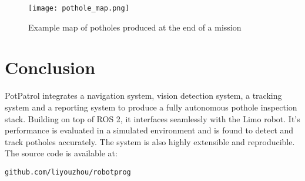 \documentclass[conference]{IEEEtran}
\begin{document}
\begin{figure}
    \centering
    \texttt{[image: pothole\_map.png]}
    \caption{Example map of potholes produced at the end of a mission}
    \label{fig:pothole_map}
\end{figure}

\section{Conclusion}

PotPatrol integrates a navigation system, vision detection system, a tracking system and a reporting system to produce a fully autonomous pothole inspection stack. Building on top of ROS 2, it interfaces seamlessly with the Limo robot. It's performance is evaluated in a simulated environment and is found to detect and track potholes accurately. The system is also highly extensible and reproducible. The source code is available at:

\verb|github.com/liyouzhou/robotprog|



\end{document}
